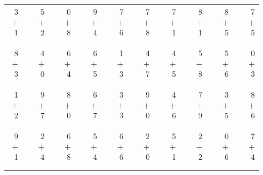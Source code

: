 \documentclass[12pt, letterpaper]{article}
\begin{document}
\begin{tabular}{rrrrrrrrrrrrrrrrrrr}
3 & & 5 & & 0 & & 9 & & 7 & & 7 & & 7 & & 8 & & 8 & & 7\\
$+$ 1 & & $+$ 2 & & $+$ 8 & & $+$ 4 & & $+$ 6 & & $+$ 8 & & $+$ 1 & & $+$ 1 & & $+$ 5 & & $+$ 5\\
\cline{1-1} \cline{3-3} \cline{5-5} \cline{7-7} \cline{9-9} \cline{11-11} \cline{13-13} \cline{15-15} \cline{17-17} \cline{19-19} \\ \\
8 & & 4 & & 6 & & 6 & & 1 & & 4 & & 4 & & 5 & & 5 & & 0\\
$+$ 3 & & $+$ 0 & & $+$ 4 & & $+$ 5 & & $+$ 3 & & $+$ 7 & & $+$ 5 & & $+$ 8 & & $+$ 6 & & $+$ 3\\
\cline{1-1} \cline{3-3} \cline{5-5} \cline{7-7} \cline{9-9} \cline{11-11} \cline{13-13} \cline{15-15} \cline{17-17} \cline{19-19} \\ \\
1 & & 9 & & 8 & & 6 & & 3 & & 9 & & 4 & & 7 & & 3 & & 8\\
$+$ 2 & & $+$ 7 & & $+$ 0 & & $+$ 7 & & $+$ 3 & & $+$ 0 & & $+$ 6 & & $+$ 9 & & $+$ 5 & & $+$ 6\\
\cline{1-1} \cline{3-3} \cline{5-5} \cline{7-7} \cline{9-9} \cline{11-11} \cline{13-13} \cline{15-15} \cline{17-17} \cline{19-19} \\ \\
9 & & 2 & & 6 & & 5 & & 6 & & 2 & & 5 & & 2 & & 0 & & 7\\
$+$ 1 & & $+$ 4 & & $+$ 8 & & $+$ 4 & & $+$ 6 & & $+$ 0 & & $+$ 1 & & $+$ 2 & & $+$ 6 & & $+$ 4\\
\cline{1-1} \cline{3-3} \cline{5-5} \cline{7-7} \cline{9-9} \cline{11-11} \cline{13-13} \cline{15-15} \cline{17-17} \cline{19-19} \\ \\
\end{tabular}
\newpage
\end{document}
